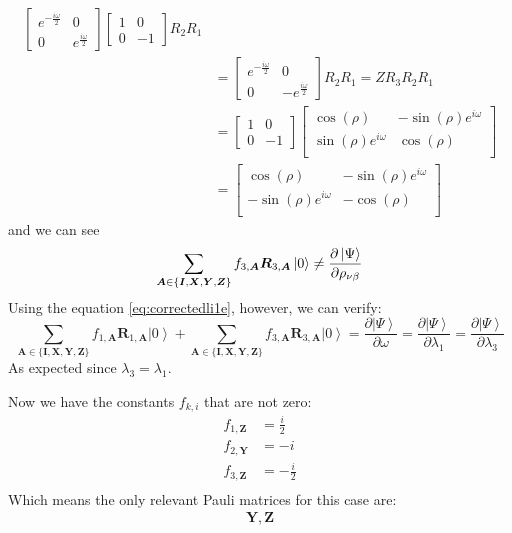 \documentclass{aux/ttuthes2007}
\newcommand{\ket}[1]{\ensuremath{\left|#1\right\rangle}}
\newcommand{\s}[1]{\sin\left( #1 \right)}
\newcommand{\co}[1]{\cos\left( #1 \right)}
\newcommand{\fpd}[2]{\frac{\partial #1}{\partial #2}}
\newcommand{\ind}[1]{{\uo #1 \oo #1}}
\newcommand{\uo}[1]{
		\IfEqCase{#1}{
			{0}{\mu}
			{1}{\nu}
			{2}{\xi}
		}[\PackageError{uo}{Undefined option to uo: #1}{}]
}
\newcommand{\oo}[1]{
		\IfEqCase{#1}{
			{0}{\alpha}
			{1}{\beta}
			{2}{\gamma}
		}[\PackageError{unocorb}{Undefined option to unuo: #1}{}]
}
\newcommand{\Z}{\begin{bmatrix}	1 & 0 \\ 0 & -1 \end{bmatrix} }
\begin{document}
\begin{enumerate}
\begin{align*}
\begin{bmatrix}
		e^{-\frac {i\omega} 2} & 0 \\
		0 & e^{\frac {i\omega} 2}
	\end{bmatrix} 
	\Z R_2 R_1
	\\
	&=\begin{bmatrix}
		e^{-\frac {i\omega} 2} & 0 \\
		0 & -e^{\frac {i\omega} 2}
	\end{bmatrix} 
	R_2 R_1
	= Z R_3 R_2 R_1
	\\
	&= \begin{bmatrix}1 & 0 \\ 0 & -1\end{bmatrix}
	\begin{bmatrix}
		\co \rho & - \s \rho e^{i\omega} \\
		\s \rho e^{i\omega} & \co \rho\\
	\end{bmatrix} 
	\\
	&= \begin{bmatrix}
		\co \rho &  -\s \rho e^{i\omega} \\
		-\s \rho e^{i\omega} & -\co \rho\\
	\end{bmatrix} 
\end{align*}
%
and we can see
%
$$
	\sum_{\bm A \in \{\bm I, \bm X, \bm Y, \bm Z\}} f_{3, \bm A} \bm R_{3, \bm A} \ket 0 
	\neq \fpd{\ket\Psi}{\rho_\ind 1}
$$
%
Using the equation \ref{eq:correctedli1e}, however, we can verify:
%
$$
	\sum_{\bm A \in \{\bm I, \bm X, \bm Y, \bm Z\}} f_{1, \bm A} \bm R_{1, \bm A} \ket 0 
	+ \sum_{\bm A \in \{\bm I, \bm X, \bm Y, \bm Z\}} f_{3, \bm A} \bm R_{3, \bm A} \ket 0 
	= \fpd{\ket\Psi}{\omega}
	= \fpd{\ket\Psi}{\lambda_1}
	= \fpd{\ket\Psi}{\lambda_3}
$$
%
As expected since $\lambda_3 = \lambda_1$.
%
\end{enumerate}
%
Now we have the constants $f_{k, i}$ that are not zero:
%
\begin{equation*}
	\begin{split}
		f_{1, \bm {Z}} &= \frac i 2 \\
		f_{2, \bm {Y}} &= -i \\
		f_{3, \bm {Z}} &= -\frac i 2 \\
	\end{split}
\end{equation*}
%
Which means the only relevant Pauli matrices for this case are:
%
\begin{align*}
	\bm Y, \bm Z
\end{align*}
\end{document}
